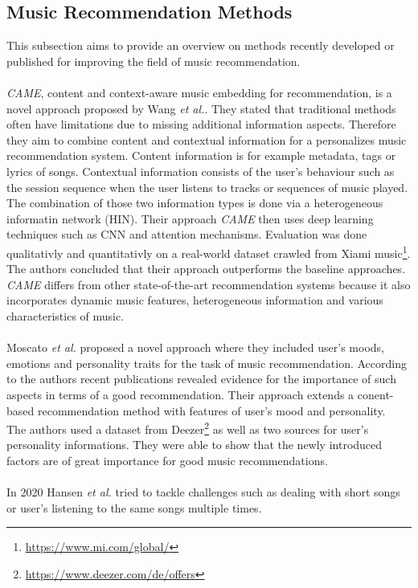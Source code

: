 \documentclass[runningheads,a4paper]{llncs}
\begin{document}
\subsection{Music Recommendation Methods} 
This subsection aims to provide an overview on methods recently developed or published for improving the field of music recommendation.\\
\\
\textit{CAME}, content and context-aware music embedding for recommendation, is a novel approach proposed by Wang \textit{et al.}.
They stated that traditional methods often have limitations due to missing additional information aspects. 
Therefore they aim to combine content and contextual information for a personalizes music recommendation system. 
Content information is for example metadata, tags or lyrics of songs. 
Contextual information consists of the user's behaviour such as the session sequence when the user listens to tracks or sequences of music played. 
The combination of those two information types is done via a heterogeneous informatin network (HIN).
Their approach \textit{CAME} then uses deep learning techniques such as CNN and attention mechanisms.
Evaluation was done qualitativly and quantitativly on a real-world dataset crawled from Xiami music\footnote{\url{https://www.mi.com/global/}}. 
The authors concluded that their approach outperforms the baseline approaches.
\textit{CAME} differs from other state-of-the-art recommendation systems because it 
also incorporates dynamic music features, heterogeneous information and various characteristics of music.
\cite{wang2020came}\\
\\
Moscato \textit{et al.} proposed a novel approach where they included user's moods, emotions and personality traits for the 
task of music recommendation. According to the authors recent publications revealed evidence for the importance of such aspects in terms of 
a good recommendation.
Their approach extends a conent-based recommendation method with features of user's mood and personality.\\
The authors used a dataset from Deezer\footnote{\url{https://www.deezer.com/de/offers}} as well as two sources for 
user's personality informations. 
They were able to show that the newly introduced factors are of great importance for good music recommendations. \cite{moscato2020emotional}\\
\\
In 2020 Hansen \textit{et al.} tried to tackle challenges such as dealing with short songs or user's listening to the same songs multiple times.
\end{document}
